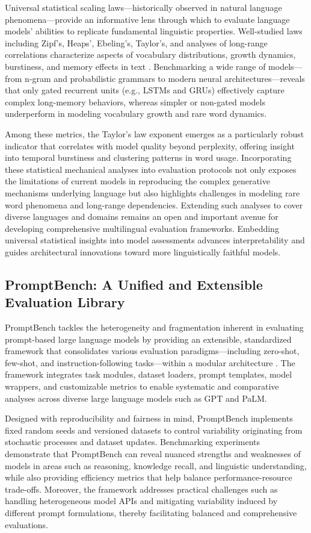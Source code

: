 \documentclass[sigconf]{acmart}
\begin{document}
Universal statistical scaling laws---historically observed in natural language phenomena---provide an informative lens through which to evaluate language models' abilities to replicate fundamental linguistic properties. Well-studied laws including Zipf’s, Heaps’, Ebeling’s, Taylor’s, and analyses of long-range correlations characterize aspects of vocabulary distributions, growth dynamics, burstiness, and memory effects in text \cite{ref51}. Benchmarking a wide range of models---from n-gram and probabilistic grammars to modern neural architectures---reveals that only gated recurrent units (e.g., LSTMs and GRUs) effectively capture complex long-memory behaviors, whereas simpler or non-gated models underperform in modeling vocabulary growth and rare word dynamics.

Among these metrics, the Taylor’s law exponent emerges as a particularly robust indicator that correlates with model quality beyond perplexity, offering insight into temporal burstiness and clustering patterns in word usage. Incorporating these statistical mechanical analyses into evaluation protocols not only exposes the limitations of current models in reproducing the complex generative mechanisms underlying language but also highlights challenges in modeling rare word phenomena and long-range dependencies. Extending such analyses to cover diverse languages and domains remains an open and important avenue for developing comprehensive multilingual evaluation frameworks. Embedding universal statistical insights into model assessments advances interpretability and guides architectural innovations toward more linguistically faithful models.

\subsection{PromptBench: A Unified and Extensible Evaluation Library}

PromptBench tackles the heterogeneity and fragmentation inherent in evaluating prompt-based large language models by providing an extensible, standardized framework that consolidates various evaluation paradigms---including zero-shot, few-shot, and instruction-following tasks---within a modular architecture \cite{ref6}. The framework integrates task modules, dataset loaders, prompt templates, model wrappers, and customizable metrics to enable systematic and comparative analyses across diverse large language models such as GPT and PaLM.

Designed with reproducibility and fairness in mind, PromptBench implements fixed random seeds and versioned datasets to control variability originating from stochastic processes and dataset updates. Benchmarking experiments demonstrate that PromptBench can reveal nuanced strengths and weaknesses of models in areas such as reasoning, knowledge recall, and linguistic understanding, while also providing efficiency metrics that help balance performance-resource trade-offs. Moreover, the framework addresses practical challenges such as handling heterogeneous model APIs and mitigating variability induced by different prompt formulations, thereby facilitating balanced and comprehensive evaluations.
\end{document}
